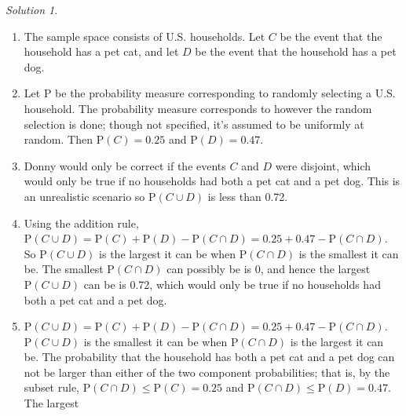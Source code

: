 \documentclass[
  letterpaper,
  DIV=11,
  numbers=noendperiod]{scrreprt}
\providecommand{\tightlist}{%
  \setlength{\itemsep}{0pt}\setlength{\parskip}{0pt}}
\theoremstyle{plain}
\theoremstyle{definition}
\theoremstyle{definition}
\theoremstyle{definition}
\theoremstyle{remark}
\newtheorem{refsolution}{Solution}[chapter]
\begin{document}
\begin{tcolorbox}[enhanced jigsaw, opacityback=0, rightrule=.15mm, coltitle=black, colframe=quarto-callout-tip-color-frame, toprule=.15mm, colbacktitle=quarto-callout-tip-color!10!white, opacitybacktitle=0.6, left=2mm, toptitle=1mm, breakable, title={Solution (click to expand)}, bottomtitle=1mm, colback=white, leftrule=.75mm, titlerule=0mm, arc=.35mm, bottomrule=.15mm]

\begin{refsolution}
\leavevmode

\begin{enumerate}
\def\labelenumi{\arabic{enumi}.}
\tightlist
\item
  The sample space consists of U.S. households. Let \(C\) be the event
  that the household has a pet cat, and let \(D\) be the event that the
  household has a pet dog.
\item
  Let \(\textrm{P}\) be the probability measure corresponding to
  randomly selecting a U.S. household. The probability measure
  corresponds to however the random selection is done; though not
  specified, it's assumed to be uniformly at random. Then
  \(\textrm{P}(C) = 0.25\) and \(\textrm{P}(D) = 0.47\).
\item
  Donny would only be correct if the events \(C\) and \(D\) were
  disjoint, which would only be true if no households had both a pet cat
  and a pet dog. This is an unrealistic scenario so
  \(\textrm{P}(C \cup D)\) is less than 0.72.
\item
  Using the addition rule,
  \(\textrm{P}(C \cup D) = \textrm{P}(C) + \textrm{P}(D) - \textrm{P}(C \cap D) = 0.25 + 0.47 - \textrm{P}(C\cap D).\)
  So \(\textrm{P}(C\cup D)\) is the largest it can be when
  \(\textrm{P}(C \cap D)\) is the smallest it can be. The smallest
  \(\textrm{P}(C \cap D)\) can possibly\footnotemark{} be is 0, and
  hence the largest \(\textrm{P}(C\cup D)\) can be is 0.72, which would
  only be true if no households had both a pet cat and a pet dog.
\item
  \(\textrm{P}(C \cup D) = \textrm{P}(C) + \textrm{P}(D) - \textrm{P}(C \cap D) = 0.25 + 0.47 - \textrm{P}(C\cap D)\).
  \(\textrm{P}(C\cup D)\) is the smallest it can be when
  \(\textrm{P}(C \cap D)\) is the largest it can be. The probability
  that the household has both a pet cat and a pet dog can not be larger
  than either of the two component probabilities; that is, by the subset
  rule, \(\textrm{P}(C\cap D)\le \textrm{P}(C) = 0.25\) and
  \(\textrm{P}(C\cap D)\le \textrm{P}(D) = 0.47\). The largest

\end{enumerate}
\end{refsolution}
\end{tcolorbox}
\end{document}
